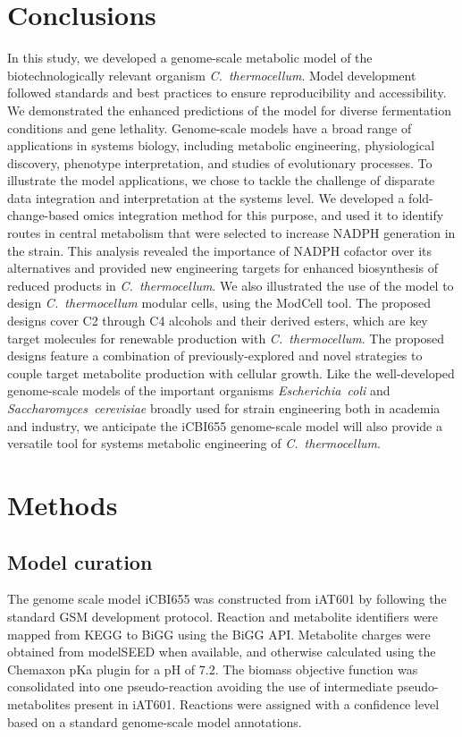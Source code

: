 \section{Conclusions}
In this study, we developed a genome-scale metabolic model of the biotechnologically relevant organism \textit{C.~thermocellum}.
Model development followed standards and best practices to ensure reproducibility and accessibility.
We demonstrated the enhanced predictions of the model for diverse fermentation conditions and gene lethality. %
Genome-scale models have a broad range of applications in systems biology, including metabolic engineering, physiological discovery, phenotype interpretation, and studies of evolutionary processes.\citep{feist2008, palsson2015} To illustrate the model applications, we chose to tackle the challenge of disparate data integration and interpretation at the systems level. We developed a fold-change-based omics integration method for this purpose, and used it to identify routes in central metabolism that were selected to increase NADPH generation in the  strain. This analysis revealed the importance of NADPH cofactor over its alternatives and provided new engineering targets for enhanced biosynthesis of reduced products in \textit{C.~thermocellum}.
We also illustrated the use of the model to design \textit{C.~thermocellum} modular cells, using the ModCell tool.\citep{garcia2019b} The proposed designs cover C2 through C4 alcohols and their derived esters, which are key target molecules for renewable production with \textit{C.~thermocellum}.\citep{peters2018}
The proposed designs feature a combination of previously-explored and novel strategies to couple target metabolite production with cellular growth.
Like the well-developed genome-scale models\citep{monk2017, lu2019} of the important organisms \textit{Escherichia~coli} and \textit{Saccharomyces~cerevisiae} broadly used for strain engineering both in academia\citep{blazeck2010} and industry\citep{yim2011a}, we anticipate the iCBI655 genome-scale model will also provide a versatile tool for systems metabolic engineering of \textit{C.~thermocellum}.

\section{Methods}

\subsection{Model curation}
The genome scale model iCBI655 was constructed from  iAT601\citep{thompson2016} by following the standard GSM development
protocol.\citep{thiele2010}
Reaction and metabolite identifiers were mapped from KEGG to BiGG using the BiGG API.\citep{king2015}
Metabolite charges were obtained from modelSEED when available, and otherwise calculated using the Chemaxon pKa plugin\citep{szegezdi2007} for a pH of 7.2.\citep{thiele2010}
The biomass objective function was consolidated into one pseudo-reaction avoiding the use of intermediate pseudo-metabolites present in iAT601.
Reactions were assigned with a confidence level based on a standard genome-scale model annotations.\citep{thiele2010}

